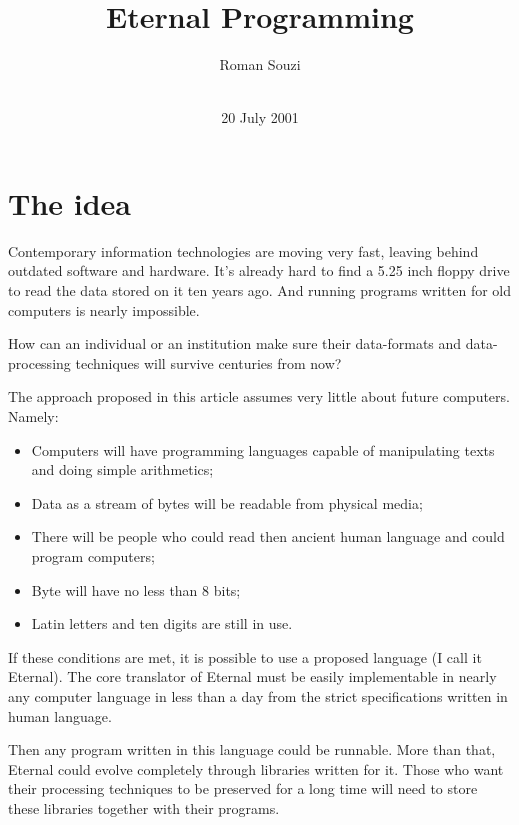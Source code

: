 \documentclass{acm_proc_article-sp}
\begin{document}
\title{Eternal Programming}


\author{
\alignauthor Roman Souzi\\
       \\
}

\date{20 July 2001}
\maketitle

\section{The idea}
Contemporary information technologies are moving very fast, leaving behind outdated software and hardware. It's already hard to find a 5.25 inch floppy drive to read the data stored on it ten years ago. And running programs written for old computers is nearly impossible.

How can an individual or an institution make sure their data-formats and data-processing techniques will survive centuries from now?

The approach proposed in this article assumes very little about future computers. Namely:

\begin{itemize}
\item Computers will have programming languages capable of manipulating texts and doing simple arithmetics;
\item Data as a stream of bytes will be readable from physical media;
\item There will be people who could read then ancient human language and could program computers;
\item Byte will have no less than 8 bits;
\item Latin letters and ten digits are still in use.
\end{itemize}

If these conditions are met, it is possible to use a proposed language (I call it Eternal). The core translator of Eternal must be easily implementable in nearly any computer language in less than a day from the strict specifications written in human language.

Then any program written in this language could be runnable. More than that, Eternal could evolve completely through libraries written for it. Those who want their processing techniques to be preserved for a long time will need to store these libraries together with their programs. 
\end{document}
